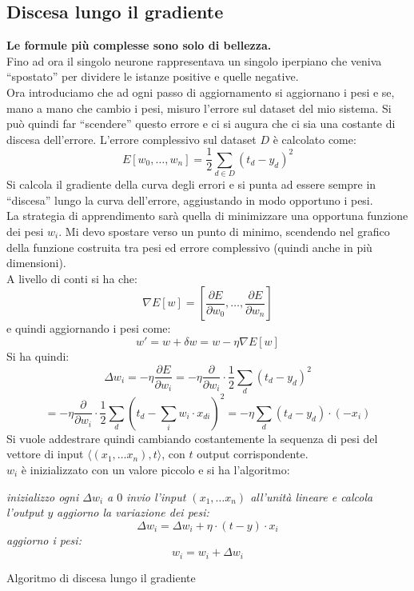 \documentclass[a4paper,12pt, oneside]{book}
\begin{document}
\subsection{Discesa lungo il gradiente}
\textbf{Le formule più complesse sono solo di bellezza.}\\
\noindent
Fino ad ora il singolo neurone rappresentava un singolo iperpiano che veniva
``spostato'' per dividere le istanze positive e quelle negative.\\
Ora introduciamo che ad ogni passo di aggiornamento si aggiornano i pesi e se,
mano a mano che cambio i pesi, misuro l'errore sul dataset del mio sistema. Si
può quindi far ``scendere'' questo errore e ci si augura che ci sia una costante
di discesa dell'errore. L'errore complessivo sul dataset $D$ è calcolato come:
\[E[w_0,\ldots, w_n]=\frac{1}{2}\sum_{d\in D}(t_d-y_d)^2\]
Si calcola il gradiente della curva degli errori e si punta ad essere sempre in
``discesa'' lungo la curva dell'errore, aggiustando in modo opportuno i pesi.\\
La strategia di apprendimento sarà quella di minimizzare una opportuna
funzione dei pesi $w_i$. Mi devo spostare verso un punto di minimo, scendendo
nel grafico della funzione costruita tra pesi ed errore complessivo (quindi
anche in più dimensioni).\\
A livello di conti si ha che:
\[\nabla E[w]=\left[\frac{\partial E}{\partial w_0},\ldots,\frac{\partial
      E}{\partial w_n}\right]\]
e quindi aggiornando i pesi come:
\[w'=w+\delta w= w-\eta\nabla E[w]\]
Si ha quindi:
\[\Delta w_i=-\eta\frac{\partial E}{\partial w_i}=-\eta\frac{\partial}{\partial
    w_i}\cdot \frac{1}{2}\sum_d (t_d-y_d)^2\]
\[=-\eta\frac{\partial}{\partial
    w_i}\cdot \frac{1}{2}\sum_d (t_d-\sum_i w_i\cdot x_{di})^2=
  -\eta\sum_d(t_d-y_d)\cdot(-x_i)\]
Si vuole addestrare quindi cambiando costantemente la sequenza di pesi del
vettore di input $\langle( x_1, \ldots x_n),t\rangle$, con $t$ output
corrispondente.\\
$w_i$ è inizializzato con un valore piccolo e si ha l'algoritmo:
\begin{algorithm}[H]
  \begin{algorithmic}
    \State \textit{inizializzo ogni $\Delta w_i$ a $0$}
    \State \textit{invio l'input $( x_1, \ldots x_n)$ all'unità lineare e
    calcola l'output $y$} 
    \State \textit{aggiorno la variazione dei pesi:}
    \[\Delta w_i=\Delta w_i+\eta\cdot (t-y)\cdot x_i\]
    \EndFor
    \State \textit{aggiorno i pesi:}
    \[w_i=w_i+\Delta w_i\]
    \EndFunction
  \end{algorithmic}
  \caption{Algoritmo di discesa lungo il gradiente}
\end{algorithm}
\end{document}
